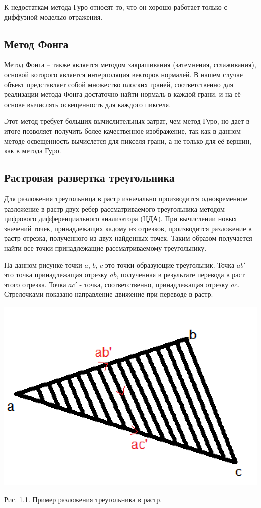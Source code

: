 \documentclass[12pt]{report}
\begin{document}
	К недостаткам метода Гуро относят то, что он хорошо работает только с диффузной моделью отражения. 

	\subsection{Метод Фонга}
	Метод Фонга – также является методом закрашивания (затемнения, сглаживания), основой которого является интерполяция векторов нормалей. В нашем случае объект представляет собой множество плоских граней, соответственно для реализации метода Фонга достаточно найти нормаль в каждой грани, и на её основе вычислять освещенность для каждого пикселя.\cite{4}
	
	Этот метод требует больших вычислительных затрат, чем метод Гуро, но дает в итоге позволяет получить более качественное изображение, так как в данном методе освещенность вычислется для пикселя грани, а не только для её вершин, как в метода Гуро.
	
	\subsection{Растровая развертка треугольника}
	
	Для разложения треугольница в растр изначально производится одновременное разложение в растр двух ребер рассматриваемого треугольника методом цифрового дифференциального анализатора (ЦДА)\cite{5}. При вычислении новых значений точек, принадлежащих кадому из отрезков, производится разложение в растр отрезка, полученного из двух найденных точек. Таким образом получается найти все точки принадлежащие рассматриваемому треугольнику.
	
	На данном рисунке точки $a$, $b$, $c$ это точки образующие треугольник. Точка $ab'$ - это точка принадлежащая отрезку $ab$, полученная в результате перевода в раст этого отрезка. Точка $ac'$ - точка, соответственно, принадлежащая отрезку $ac$. Стрелочками показано направление движение при переводе в растр.
	\begin{center}
		\includegraphics[scale=0.7]{cda.png}
		
		Рис. 1.1. Пример разложения треугольника в растр.
	\end{center}
	
\end{document}
